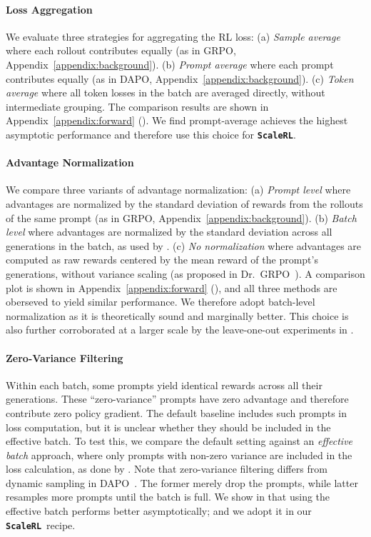 \documentclass[]{fairmeta} %
\newcommand{\scalerl}{\texttt{\textbf{ScaleRL}}}
\begin{document}
\paragraph{Loss Aggregation}

We evaluate three strategies for aggregating the RL loss: (a) \emph{Sample average} where each rollout contributes equally (as in GRPO, Appendix~\ref{appendix:background}). (b) \emph{Prompt average} where each prompt contributes equally (as in DAPO, Appendix~\ref{appendix:background}). (c) \emph{Token average} where all token losses in the batch are averaged directly, without intermediate grouping. The comparison results are shown in Appendix~\ref{appendix:forward} ().
We find prompt-average achieves the highest asymptotic performance and therefore use this choice for \scalerl. 


\paragraph{Advantage Normalization}

We compare three variants of advantage normalization: (a) \emph{Prompt level} where advantages are normalized by the standard deviation of rewards from the rollouts of the same prompt (as in GRPO, Appendix~\ref{appendix:background}). (b) \emph{Batch level} where advantages are normalized by the standard deviation across all generations in the batch, as used by \citet{hu2025reinforce_pp,rastogi2025magistral}. (c) \emph{No normalization} where advantages are computed as raw rewards centered by the mean reward of the prompt’s generations, without variance scaling (as proposed in Dr.\ GRPO~\citep{dr_grpo}). A comparison plot is shown in Appendix~\ref{appendix:forward} (), and all three methods are oberseved to yield similar performance. We therefore adopt batch-level normalization as it is theoretically sound and marginally better. This choice is also further corroborated at a larger scale by the leave-one-out experiments in .

\paragraph{Zero-Variance Filtering}
\label{sec:batch_definition}

Within each batch, some prompts yield identical rewards across all their generations. 
These ``zero-variance'' prompts have zero advantage and therefore contribute zero policy gradient. 
The default baseline includes such prompts in loss computation, but it is unclear whether they should be included in the effective batch. 
To test this, we compare the default setting against an \emph{effective batch} approach, where only prompts with non-zero variance are included in the loss calculation, as done by \citet{seed2025seed1}. Note that zero-variance filtering differs from dynamic sampling in DAPO~\citep{yu2025dapo}. The former merely drop the prompts, while latter resamples more prompts until the batch is full.
We show in  that using the effective batch performs better asymptotically; and we adopt it in our \scalerl\ recipe.
\end{document}
